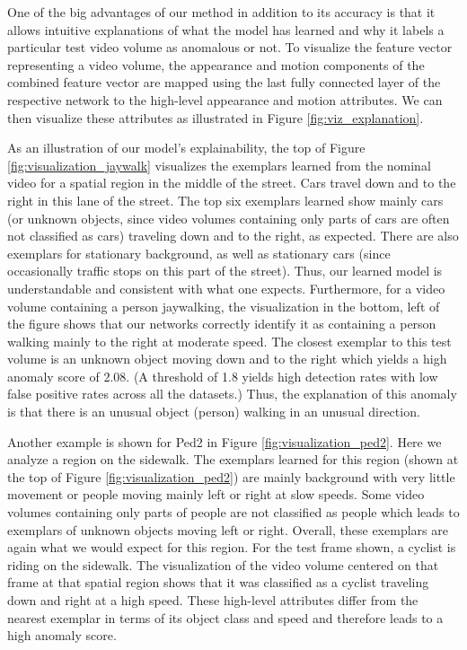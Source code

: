 One of the big advantages of our method in addition to its accuracy is that it allows intuitive explanations of what the model has learned and why it labels a particular test video volume as anomalous or not.  To visualize the feature vector representing a video volume, the appearance and motion components of the combined feature vector are mapped using the last fully connected layer of the respective network to the high-level appearance and motion attributes.  We can then visualize these attributes as illustrated in Figure \ref{fig:viz_explanation}.

As an illustration of our model's explainability, the top of Figure \ref{fig:visualization_jaywalk} visualizes the exemplars learned from the nominal video for a spatial region in the middle of the street.
Cars travel down and to the right in this lane of the street.  The top six exemplars learned show mainly cars (or unknown objects, since video volumes containing only parts of cars are often not classified as cars) traveling down and to the right, as expected.  There are also exemplars for stationary background, as well as stationary cars (since occasionally traffic stops on this part of the street).  Thus, our learned model is understandable and consistent with what one expects.
Furthermore, for a video volume containing a person jaywalking, the visualization in the bottom, left of the figure shows that our networks correctly identify it as containing a person walking mainly to the right at moderate speed.  The closest exemplar to this test volume is an unknown object moving down and to the right  which yields a high anomaly score of 2.08.  (A threshold of 1.8 yields high detection rates with low false positive rates across all the datasets.)  Thus, the explanation of this anomaly is that there is an unusual object (person) walking in an unusual direction.

Another example is shown for Ped2 in Figure \ref{fig:visualization_ped2}.  Here we analyze a region on the sidewalk.  The exemplars learned for this region (shown at the top of Figure \ref{fig:visualization_ped2}) are mainly background with very little movement or people moving mainly left or right at slow speeds. Some video volumes containing only parts of people are not classified as people which leads to exemplars of unknown objects moving left or right.  Overall, these exemplars are again what we would expect for this region.  For the test frame shown, a cyclist is riding on the sidewalk.  The visualization of the video volume centered on that frame at that spatial region shows that it was classified as a cyclist traveling down and right at a high speed.  These high-level attributes differ from the nearest exemplar in terms of its object class and speed and therefore leads to a high anomaly score.

